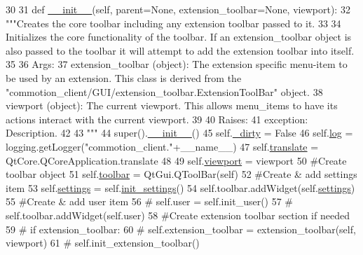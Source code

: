\begin{DoxyCode}
30 
31     \textcolor{keyword}{def }\hyperlink{classcommotion__client_1_1GUI_1_1toolbar_1_1ToolBar_acea995f0bbf3a6e28c07b315e07b0af6}{\_\_init\_\_}(self, parent=None, extension\_toolbar=None, viewport):
32         \textcolor{stringliteral}{"""Creates the core toolbar including any extension toolbar passed to it.}
33 \textcolor{stringliteral}{        }
34 \textcolor{stringliteral}{        Initializes the core functionality of the toolbar. If an extension\_toolbar object is also passed to
       the toolbar it will attempt to add the extension toolbar into itself.}
35 \textcolor{stringliteral}{        }
36 \textcolor{stringliteral}{        Args:}
37 \textcolor{stringliteral}{          extension\_toolbar (object): The extension specific menu-item to be used by an extension. This
       class is derived from the "commotion\_client/GUI/extension\_toolbar.ExtensionToolBar" object.}
38 \textcolor{stringliteral}{          viewport (object): The current viewport. This allows menu\_items to have its actions interact with
       the current viewport.}
39 \textcolor{stringliteral}{}
40 \textcolor{stringliteral}{        Raises:}
41 \textcolor{stringliteral}{          exception: Description.}
42 \textcolor{stringliteral}{        }
43 \textcolor{stringliteral}{        """}
44         super().\hyperlink{classcommotion__client_1_1GUI_1_1toolbar_1_1ToolBar_acea995f0bbf3a6e28c07b315e07b0af6}{\_\_init\_\_}()
45         self.\hyperlink{classcommotion__client_1_1GUI_1_1toolbar_1_1ToolBar_a3d4267f273f2262c1b97b9ed3e04aebd}{\_dirty} = \textcolor{keyword}{False}
46         self.\hyperlink{classcommotion__client_1_1GUI_1_1toolbar_1_1ToolBar_ac2987b2184e47fa5c08c1c753bafaa8b}{log} = logging.getLogger(\textcolor{stringliteral}{"commotion\_client."}+\_\_name\_\_)
47         self.\hyperlink{classcommotion__client_1_1GUI_1_1toolbar_1_1ToolBar_a5ec3c619935f7e0626f9cb608be8e27f}{translate} = QtCore.QCoreApplication.translate
48 
49         self.\hyperlink{classcommotion__client_1_1GUI_1_1toolbar_1_1ToolBar_a34d12135499302eef49fbe526cd0d66b}{viewport} = viewport
50         \textcolor{comment}{#Create toolbar object}
51         self.\hyperlink{classcommotion__client_1_1GUI_1_1toolbar_1_1ToolBar_a30d7fa9d80355eb4d3d214cc0511de88}{toolbar} = QtGui.QToolBar(self)
52         \textcolor{comment}{#Create & add settings item}
53         self.\hyperlink{classcommotion__client_1_1GUI_1_1toolbar_1_1ToolBar_af5761f237999d6146ebe2e296306e5b7}{settings} = self.\hyperlink{classcommotion__client_1_1GUI_1_1toolbar_1_1ToolBar_acb467ccaffdcd2c10fcce88a2d167079}{init\_settings}()
54         self.toolbar.addWidget(self.\hyperlink{classcommotion__client_1_1GUI_1_1toolbar_1_1ToolBar_af5761f237999d6146ebe2e296306e5b7}{settings})
55         \textcolor{comment}{#Create & add user item}
56 \textcolor{comment}{#        self.user = self.init\_user()}
57 \textcolor{comment}{#        self.toolbar.addWidget(self.user)}
58         \textcolor{comment}{#Create extension toolbar section if needed}
59 \textcolor{comment}{#        if extension\_toolbar:}
60 \textcolor{comment}{#            self.extension\_toolbar = extension\_toolbar(self, viewport)}
61 \textcolor{comment}{#            self.init\_extension\_toolbar()}

\end{DoxyCode}

